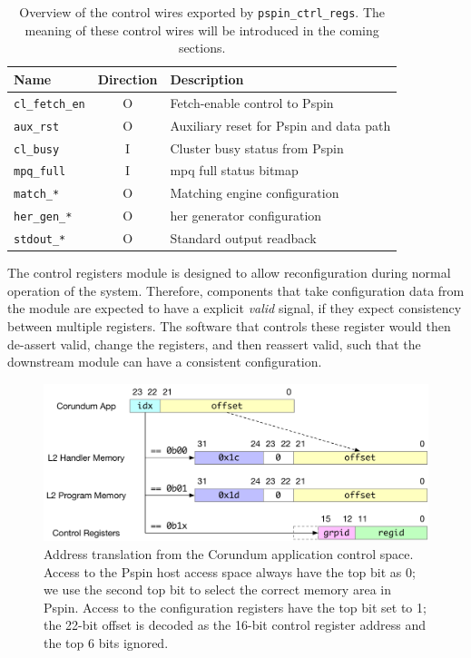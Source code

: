 \begin{table}[ht]
    \centering
    \begin{tabular}{lcl}
    \toprule
    Name & Direction & Description \\ \midrule
    \texttt{cl\_fetch\_en} & O & Fetch-enable control to P\acs{spin} \\
    \texttt{aux\_rst} & O & Auxiliary reset for P\acs{spin} and data path \\
    \texttt{cl\_busy} & I & Cluster busy status from P\acs{spin} \\
    \texttt{mpq\_full} & I & \ac{mpq} full status bitmap \\
    \texttt{match\_*} & O & Matching engine configuration \\
    \texttt{her\_gen\_*} & O & \ac{her} generator configuration \\
    \texttt{stdout\_*} & O & Standard output readback \\
    \bottomrule
    \end{tabular}
    \caption{Overview of the control wires exported by \texttt{pspin\_ctrl\_regs}.  The meaning of these control wires will be introduced in the coming sections.}
    \label{tab:ctrl-signals}
\end{table}

The control registers module is designed to allow reconfiguration during normal operation of the system.  Therefore, components that take configuration data from the module are expected to have a explicit \emph{valid} signal, if they expect consistency between multiple registers.  The software that controls these register would then de-assert valid, change the registers, and then reassert valid, such that the downstream module can have a consistent configuration.

\begin{figure}
    \centering
    \includegraphics[width=.8\textwidth]{figures/corundum-pspin-addr.pdf}
    \caption{Address translation from the Corundum application control space.  Access to the P\acs{spin} host access space always have the top bit as 0; we use the second top bit to select the correct memory area in P\acs{spin}.  Access to the configuration registers have the top bit set to 1; the 22-bit offset is decoded as the 16-bit control register address and the top 6 bits ignored.} \label{fig:hw-addr-map}
\end{figure}

